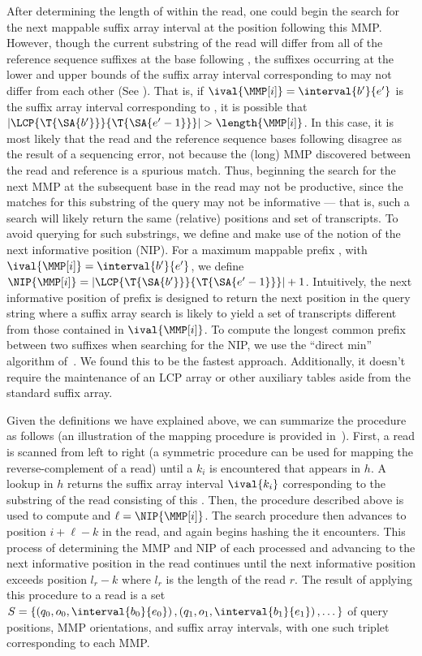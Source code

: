 After determining the length of \MMP[i] within the read, one could begin the search for the next mappable suffix array interval at the position following this MMP. However, though the current substring of the read will differ from all of the reference sequence suffixes at the base following \MMP[i], the suffixes occurring at the lower and upper bounds of the suffix array interval corresponding to \MMP[i] may not differ from each other (See ).  That is, if $\ival{\MMP[i]} = \interval{b'}{e'}$ is the suffix array interval corresponding to \MMP[i], it is possible that $\left|\LCP{\T{\SA{b'}}}{\T{\SA{{e'-1}}}}\right| > \length{\MMP[i]}$.  In this case, it is most likely that the read and the reference sequence bases following \MMP[i] disagree as the result of a sequencing error, not because the (long) MMP discovered between the read and reference is a spurious match.  Thus, beginning the search for the next MMP at the subsequent base in the read may not be productive, since the matches for this substring of the query may not be informative --- that is, such a search will likely return the same (relative) positions and set of transcripts.  To avoid querying for such substrings, we define and make use of the notion of the next informative position (NIP). For a maximum mappable prefix \MMP[i], with $\ival{\MMP[i]} = \interval{b'}{e'}$, we define $\NIP{\MMP[i]} = \left|\LCP{\T{\SA{b'}}}{\T{\SA{{e'-1}}}}\right| + 1$.  Intuitively, the next informative position of prefix \MMP[i] is designed to return the next position in the query string where a suffix array search is likely to yield a set of transcripts different from those contained in $\ival{\MMP[i]}$.  To compute the longest common prefix between two suffixes when searching for the NIP, we use the ``direct min'' algorithm of~\citet{Ilie:2010:Longest}.  We found this to be the fastest approach. Additionally, it doesn't require the maintenance of an LCP array or other auxiliary tables aside from the standard suffix array.

Given the definitions we have explained above, we can summarize the \qm procedure as follows (an illustration of the mapping procedure is provided in~). First, a read is scanned from left to right (a symmetric procedure can be used for mapping the reverse-complement of a read) until a \kmer $k_i$ is encountered that appears in $h$. A lookup in $h$ returns the suffix array interval $\ival{k_i}$ corresponding to the substring of the read consisting of this \kmer.  Then, the procedure described above is used to compute \MMP[i] and $\ell = \NIP{\MMP[i]}$.  The search procedure then advances to position $i + \ell - k$ in the read, and again begins hashing the \kmers it encounters.  This process of determining the MMP and NIP of each processed \kmer and advancing to the next informative position in the read continues until the next informative position exceeds position $l_r - k$ where $l_r$ is the length of the read $r$. The result of applying this procedure to a read is a set $S = \{\left(q_0, o_0, \interval{b_0}{e_0}\right), \left(q_1, o_1, \interval{b_1}{e_1}\right), \dots \}$ of query positions, MMP orientations, and suffix array intervals, with one such triplet corresponding to each MMP.

